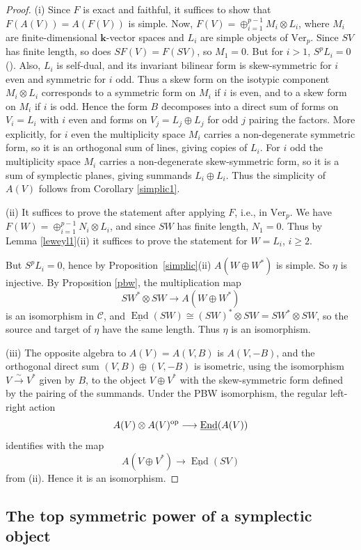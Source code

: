 \documentclass[12pt]{amsart}
\numberwithin{equation}{section}
\providecommand{\k}{}\renewcommand{\k}{\mathbf{k}}
\providecommand{\C}{}\renewcommand{\C}{\mathcal{C}}
\providecommand{\Ver}{}\renewcommand{\Ver}{\mathrm{Ver}}
\providecommand{\End}{}\renewcommand{\End}{\operatorname{End}}
\theoremstyle{plain}
\theoremstyle{definition}
\theoremstyle{remark}
\begin{document}
\begin{proof}
(i) Since $F$ is exact and faithful, it suffices to show that $F(A(V))=A(F(V))$ is simple. Now, $F(V)=\oplus_{i=1}^{p-1}M_i\otimes L_i$, where $M_i$ are finite-dimensional $\k$-vector spaces and $L_i$ are simple objects of $\Ver_p$. Since $SV$ has finite length, so does $SF(V)=F(SV)$, so $M_1=0$.
But for $i>1$, $S^pL_i=0$ (\cite[Section~6]{EOV}). Also, $L_i$ is self-dual, and its invariant bilinear form is skew-symmetric for $i$ even and symmetric for $i$ odd. Thus a skew form on the isotypic component $M_i\otimes L_i$ corresponds to a symmetric form on $M_i$ if $i$ is even, and to a skew form on $M_i$ if $i$ is odd. Hence the form $B$ decomposes into a direct sum of forms on $V_i=L_i$ with $i$ even and forms on $V_j=L_j\oplus L_j$ for odd $j$ pairing the factors. More explicitly, for $i$ even the multiplicity space $M_i$ carries a non-degenerate symmetric form, so it is an orthogonal sum of lines, giving copies of $L_i$. For $i$ odd the multiplicity space $M_i$ carries a non-degenerate skew-symmetric form, so it is a sum of symplectic planes, giving summands $L_i\oplus L_i$. Thus the simplicity of $A(V)$ follows from Corollary \ref{simplic1}. 

(ii) It suffices to prove the statement after applying $F$, i.e., in $\Ver_p$. We have $F(W)=\oplus_{i=1}^{p-1}N_i\otimes L_i$, and since $SW$ has finite length, $N_1=0$. Thus by Lemma \ref{leweyl1}(ii) it suffices to prove the statement for 
$W=L_i$, $i\ge 2$.

But $S^pL_i=0$, hence by Proposition~\ref{simplic}(ii) $A(W\oplus W^*)$ is simple. So $\eta$ is injective. By Proposition \ref{pbw}, the multiplication map 
$$
SW^*\otimes SW\to A(W\oplus W^*)
$$ 
is an isomorphism in $\C$, and $\underline{\End}(SW)\cong (SW)^*\otimes SW=SW^*\otimes SW$, so the source and target of $\eta$ have the same length. Thus $\eta$ is an isomorphism. 

(iii) The opposite algebra to $A(V)=A(V,B)$ is $A(V,-B)$, and the orthogonal direct sum $(V,B)\oplus(V,-B)$ is isometric, using the isomorphism $V\xrightarrow{\sim}V^*$ given by $B$, to the object $V\oplus V^*$ with the skew-symmetric form defined by the pairing of the summands. Under the PBW isomorphism, the regular left-right action
\[
 A(V)\otimes A(V)^{\rm op}\longrightarrow\underline{\End}(A(V))
\]
identifies with the map
\[
 A(V\oplus V^*)\longrightarrow\underline{\End}(SV)
\]
from (ii). Hence it is an isomorphism.
\end{proof} 

\subsection{The top symmetric power of a symplectic object}
\end{document}
